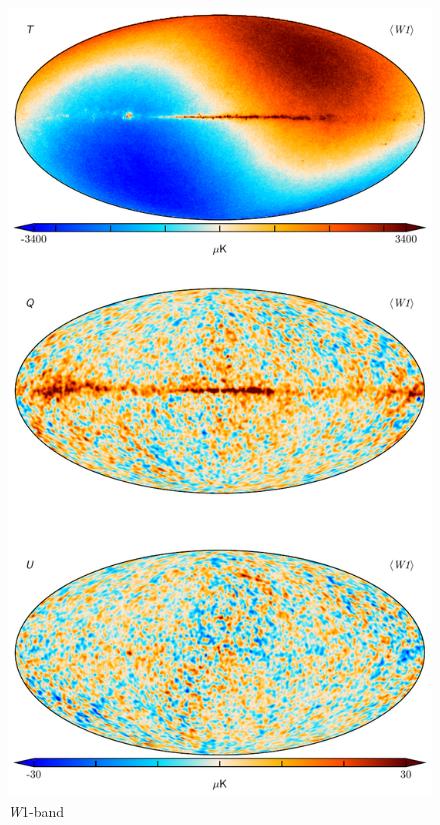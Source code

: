 \documentclass[twocolumn]{../../common/aa}
\newcommand{\W}[0]{\textit W}
\begin{document}
\begin{figure}
	\centering
	\includegraphics[height=0.9\textheight]{figures/090-WMAP_W1_map.pdf}
	\caption{\W1-band}
\end{figure}
\end{document}

